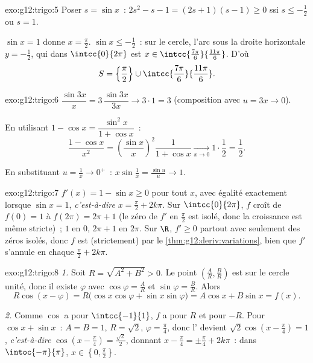 \begin{solution}{exo:g12:trigo:5}
Poser $s = \sin x$~: $2s^2 - s - 1 = (2s + 1)(s - 1) \geq 0$ ssi
$s \leq -\frac12$ ou $s = 1$.

$\sin x = 1$ donne $x = \frac\pi2$. $\sin x \leq -\frac12$~: sur le
cercle, l'arc sous la droite horizontale $y = -\frac12$, qui dans
$\intcc{0}{2\pi}$ est $x \in \intcc{\frac{7\pi}{6}}{\frac{11\pi}{6}}$.
D'où
\[
S = \left\{\frac{\pi}{2}\right\} \cup
\intcc{\frac{7\pi}{6}}{\frac{11\pi}{6}} .
\]
\end{solution}

\begin{solution}{exo:g12:trigo:6}
$\dfrac{\sin 3x}{x} = 3\,\dfrac{\sin 3x}{3x} \to 3 \cdot 1 = 3$
(composition avec $u = 3x \to 0$).

En utilisant $1 - \cos x = \dfrac{\sin^2 x}{1 + \cos x}$~:
\[
\frac{1 - \cos x}{x^2}
= \left(\frac{\sin x}{x}\right)^{\!2} \frac{1}{1 + \cos x}
\xrightarrow[x\to0]{} 1 \cdot \frac12 = \frac12 .
\]

En substituant $u = \frac1x \to 0^+$~:
$x \sin\frac1x = \frac{\sin u}{u} \to 1$.
\end{solution}

\begin{solution}{exo:g12:trigo:7}
$f'(x) = 1 - \sin x \geq 0$ pour tout $x$, avec égalité exactement lorsque
$\sin x = 1$, \emph{c'est-à-dire} $x = \frac\pi2 + 2k\pi$. Sur
$\intcc{0}{2\pi}$, $f$ croît de $f(0) = 1$ à $f(2\pi) = 2\pi + 1$ (le
zéro de $f'$ en $\frac{\pi}{2}$ est isolé, donc la croissance est même
stricte)~;  $1$ en $0$,  $2\pi + 1$ en $2\pi$. Sur $\R$,
$f' \geq 0$ partout avec seulement des zéros isolés, donc $f$ est
(strictement)  par le \cref{thm:g12:deriv:variations}, bien que
$f'$ s'annule en chaque $\frac\pi2 + 2k\pi$.
\end{solution}

\begin{solution}{exo:g12:trigo:8}
\emph{1.} Soit $R = \sqrt{A^2 + B^2} > 0$. Le point
$\left(\frac AR, \frac BR\right)$ est sur le cercle unité, donc il existe
$\varphi$ avec $\cos\varphi = \frac AR$ et $\sin\varphi = \frac BR$. Alors
\[
R\cos(x - \varphi) = R\bigl(\cos x\cos\varphi + \sin x \sin\varphi\bigr)
= A\cos x + B\sin x = f(x).
\]

\emph{2.} Comme $\cos$ a pour  $\intcc{-1}{1}$, $f$ a pour 
$R$ et pour  $-R$. Pour $\cos x + \sin x$~: $A = B = 1$,
$R = \sqrt2$, $\varphi = \frac\pi4$, donc l' devient
$\sqrt2\cos\left(x - \frac\pi4\right) = 1$, \emph{c'est-à-dire}
$\cos\left(x - \frac\pi4\right) = \frac{\sqrt2}{2}$, donnant
$x - \frac\pi4 = \pm\frac\pi4 + 2k\pi$~: dans $\intoc{-\pi}{\pi}$,
$x \in \left\{0, \frac\pi2\right\}$.
\end{solution}

